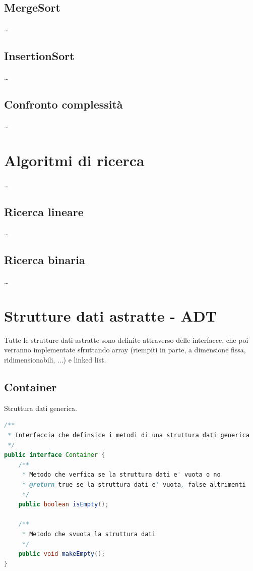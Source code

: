 \documentclass[a4paper]{article}
\begin{document}
\subsection{MergeSort}
\dots

\subsection{InsertionSort}
\dots

\subsection{Confronto complessità}
\dots

\section{Algoritmi di ricerca}
\dots

\subsection{Ricerca lineare}
\dots

\subsection{Ricerca binaria}
\dots

\newpage


\section{Strutture dati astratte - ADT}
Tutte le strutture dati astratte sono definite attraverso delle interfacce, che poi verranno implementate sfruttando array (riempiti
in parte, a dimensione fissa, ridimensionabili, ...) e linked list.

\subsection{Container}
Struttura dati generica.

\begin{lstlisting}[language=Java]
/**
 * Interfaccia che definsice i metodi di una struttura dati generica
 */
public interface Container {
	/**
	 * Metodo che verfica se la struttura dati e' vuota o no
	 * @return true se la struttura dati e' vuota, false altrimenti
	 */
	public boolean isEmpty();

	/**
	 * Metodo che svuota la struttura dati
	 */
	public void makeEmpty();
}
\end{lstlisting}
\end{document}
